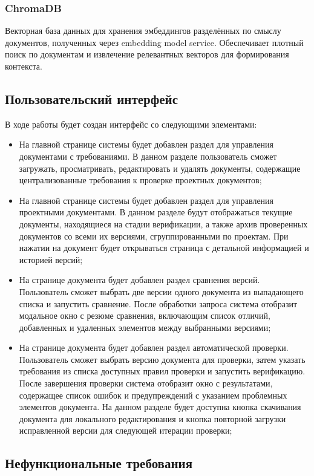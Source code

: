 \subsubsection{ChromaDB}
Векторная база данных для хранения эмбеддингов разделённых по смыслу документов, полученных через embedding model service. 
Обеспечивает плотный поиск по документам и извлечение релевантных векторов для формирования контекста.

\subsection{Пользовательский интерфейс}
В ходе работы будет создан интерфейс со следующими элементами:
\begin{itemize}[nosep, leftmargin=*, labelindent=\parindent]
  \item На главной странице системы будет добавлен раздел для управления документами с требованиями. В данном разделе пользователь сможет загружать, просматривать, редактировать и удалять документы, содержащие централизованные требования к проверке проектных документов;
  \item На главной странице системы будет добавлен раздел для управления проектными документами. В данном разделе будут отображаться текущие документы, находящиеся на стадии верификации, а также архив проверенных документов со всеми их версиями, сгруппированными по проектам. При нажатии на документ будет открываться страница с детальной информацией и историей версий;
  \item На странице документа будет добавлен раздел сравнения версий. Пользователь сможет выбрать две версии одного документа из выпадающего списка и запустить сравнение. После обработки запроса система отобразит модальное окно с резюме сравнения, включающим список отличий, добавленных и удаленных элементов между выбранными версиями;
  \item На странице документа будет добавлен раздел автоматической проверки. Пользователь сможет выбрать версию документа для проверки, затем указать требования из списка доступных правил проверки и запустить верификацию. После завершения проверки система отобразит окно с результатами, содержащее список ошибок и предупреждений с указанием проблемных элементов документа. На данном разделе будет доступна кнопка скачивания документа для локального редактирования и кнопка повторной загрузки исправленной версии для следующей итерации проверки;
\end{itemize}

\subsection{Нефункциональные требования}

